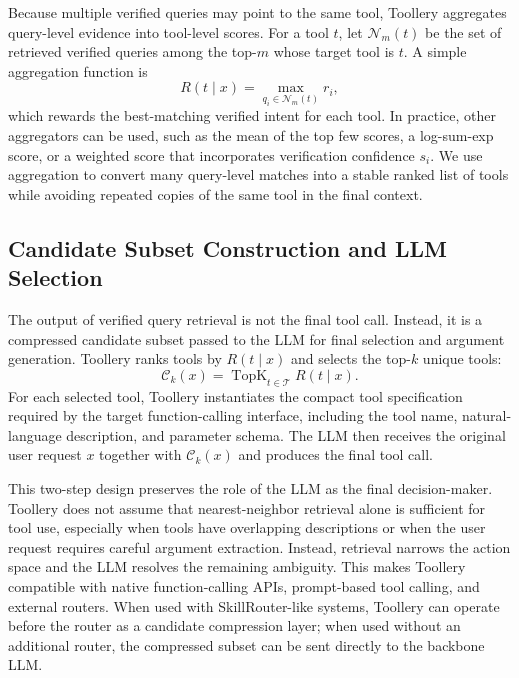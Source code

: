 Because multiple verified queries may point to the same tool, Toollery aggregates query-level evidence into tool-level scores. For a tool $t$, let $\mathcal{N}_m(t)$ be the set of retrieved verified queries among the top-$m$ whose target tool is $t$. A simple aggregation function is
\begin{equation}
    R(t \mid x) = \max_{q_i \in \mathcal{N}_m(t)} r_i,
\end{equation}
which rewards the best-matching verified intent for each tool. In practice, other aggregators can be used, such as the mean of the top few scores, a log-sum-exp score, or a weighted score that incorporates verification confidence $s_i$. We use aggregation to convert many query-level matches into a stable ranked list of tools while avoiding repeated copies of the same tool in the final context.

\subsection{Candidate Subset Construction and LLM Selection}
\label{subsec:candidate_subset}

The output of verified query retrieval is not the final tool call. Instead, it is a compressed candidate subset passed to the LLM for final selection and argument generation. Toollery ranks tools by $R(t \mid x)$ and selects the top-$k$ unique tools:
\begin{equation}
    \mathcal{C}_k(x) = \operatorname{TopK}_{t \in \mathcal{T}} R(t \mid x).
\end{equation}
For each selected tool, Toollery instantiates the compact tool specification required by the target function-calling interface, including the tool name, natural-language description, and parameter schema. The LLM then receives the original user request $x$ together with $\mathcal{C}_k(x)$ and produces the final tool call.

This two-step design preserves the role of the LLM as the final decision-maker. Toollery does not assume that nearest-neighbor retrieval alone is sufficient for tool use, especially when tools have overlapping descriptions or when the user request requires careful argument extraction. Instead, retrieval narrows the action space and the LLM resolves the remaining ambiguity. This makes Toollery compatible with native function-calling APIs, prompt-based tool calling, and external routers. When used with SkillRouter-like systems, Toollery can operate before the router as a candidate compression layer; when used without an additional router, the compressed subset can be sent directly to the backbone LLM.

